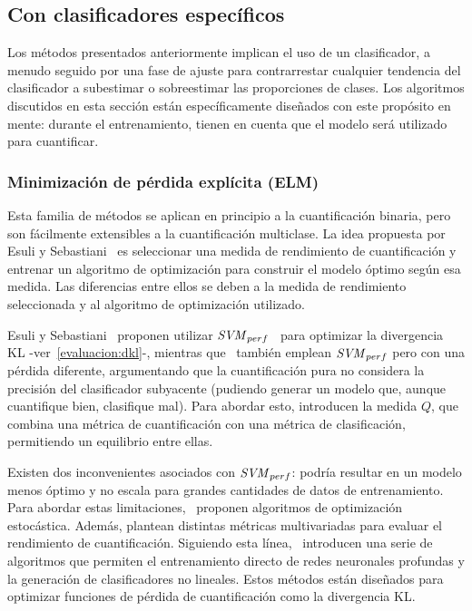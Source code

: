 \subsection{Con clasificadores específicos}\label{puntual:especificos}

Los métodos presentados anteriormente implican el uso de un clasificador, a
menudo seguido por una fase de ajuste para contrarrestar cualquier tendencia del
clasificador a subestimar o sobreestimar las proporciones de clases. Los
algoritmos discutidos en esta sección están específicamente diseñados con este
propósito en mente: durante el entrenamiento, tienen en cuenta que el modelo
será utilizado para cuantificar.

\subsubsection{Minimización de pérdida explícita (ELM)}\label{puntual:elm}

Esta familia de métodos se aplican en principio a la cuantificación binaria,
pero son fácilmente extensibles a la cuantificación multiclase. La idea
propuesta por Esuli y Sebastiani~\cite{esuli2010sentiment} es seleccionar una
medida de rendimiento de cuantificación y entrenar un algoritmo de optimización
para construir el modelo óptimo según esa medida. Las diferencias entre ellos se
deben a la medida de rendimiento seleccionada y al algoritmo de optimización
utilizado.

Esuli y Sebastiani~\cite{esuli2010sentiment, esuli2014explicit,
esuli2015optimizing} proponen utilizar
${\it{SVM}}_{perf}$~\cite{joachims2005support} para optimizar la divergencia KL
-ver~\ref{evaluacion:dkl}-, mientras que~\citet{barranquero2015quantification}
también emplean ${\it{SVM}}_{perf}$ pero con una pérdida diferente, argumentando
que la cuantificación pura no considera la precisión del clasificador subyacente
(pudiendo generar un modelo que, aunque cuantifique bien, clasifique mal). Para
abordar esto, introducen la medida $Q$, que combina una métrica de
cuantificación con una métrica de clasificación, permitiendo un equilibrio entre
ellas.

Existen dos inconvenientes asociados con ${\it{SVM}}_{perf}$: podría resultar en
un modelo menos óptimo y no escala para grandes cantidades de datos de
entrenamiento. Para abordar estas limitaciones,~\citet{kar2016online} proponen
algoritmos de optimización estocástica. Además, plantean distintas métricas
multivariadas para evaluar el rendimiento de cuantificación. Siguiendo esta
línea,~\citet{sanyal2018optimizing} introducen una serie de algoritmos que
permiten el entrenamiento directo de redes neuronales profundas y la generación
de clasificadores no lineales. Estos métodos están diseñados para optimizar
funciones de pérdida de cuantificación como la divergencia KL.

